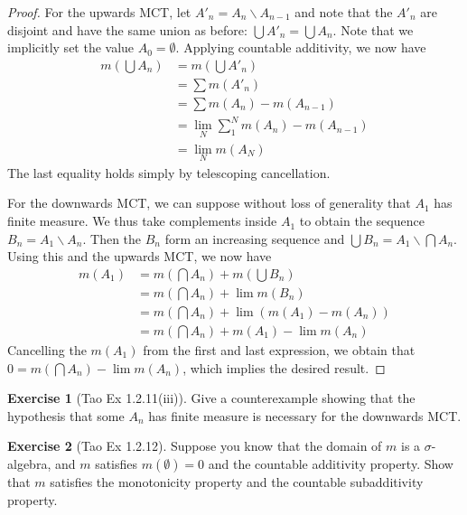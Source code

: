 \documentclass[10pt,oneside]{amsbook}
\renewcommand{\setminus}{\smallsetminus}
\theoremstyle{definition}
\newtheorem{exerc}{Exercise}[section]
\theoremstyle{plain}
\theoremstyle{definition}
\theoremstyle{remark}
\numberwithin{equation}{section}
\numberwithin{figure}{section}
\begin{document}
\begin{proof}
  For the upwards MCT, let $A'_n=A_n\setminus A_{n-1}$ and note that the $A'_n$ are disjoint and have the same union as before: $\bigcup A'_n=\bigcup A_n$. Note that we implicitly set the value $A_0=\emptyset$. Applying countable additivity, we now have
  \begin{align*}
    m(\bigcup A_n)&=m(\bigcup A'_n)\\
                  &=\sum m(A'_n)\\
                  &=\sum m(A_n)-m(A_{n-1})\\
                  &=\lim_N \sum_1^N m(A_n)-m(A_{n-1})\\
                  &=\lim_N m(A_N)
  \end{align*}
  The last equality holds simply by telescoping cancellation.

  For the downwards MCT, we can suppose without loss of generality that $A_1$ has finite measure. We thus take complements inside $A_1$ to obtain the sequence $B_n=A_1\setminus A_n$. Then the $B_n$ form an increasing sequence and $\bigcup B_n=A_1\setminus\bigcap A_n$. Using this and the upwards MCT, we now have
  \begin{align*}
    m(A_1)&=m(\bigcap A_n)+m(\bigcup B_n)\\
          &=m(\bigcap A_n)+\lim m(B_n)\\
          &=m(\bigcap A_n)+\lim (m(A_1)-m(A_n))\\
          &=m(\bigcap A_n)+m(A_1)-\lim m(A_n)
  \end{align*}
  Cancelling the $m(A_1)$ from the first and last expression, we obtain that $0=m(\bigcap A_n)-\lim m(A_n)$, which implies the desired result.
\end{proof}

\begin{exerc}[Tao Ex 1.2.11(iii)]
  Give a counterexample showing that the hypothesis that some $A_n$ has finite measure is necessary for the downwards MCT.
\end{exerc}

\begin{exerc}[Tao Ex 1.2.12]
  Suppose you know that the domain of $m$ is a $\sigma$-algebra, and $m$ satisfies $m(\emptyset)=0$ and the countable additivity property. Show that $m$ satisfies the monotonicity property and the countable subadditivity property.
\end{exerc}
\end{document}
